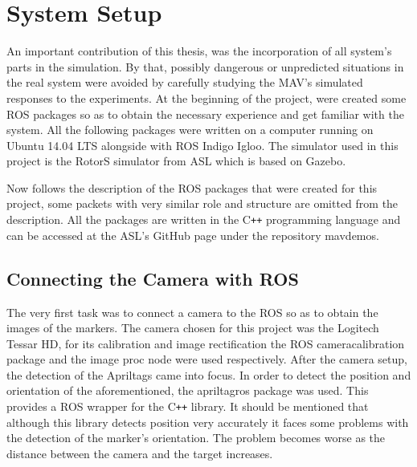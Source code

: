 \chapter{System Setup}
\label{sec:SystemSetup}

An important contribution of this thesis, was the incorporation of all system's parts in the simulation. By that,  possibly dangerous or unpredicted situations in the real system were avoided by carefully studying the MAV's simulated responses to the experiments. At the beginning of the project, were created some ROS packages so as to obtain the necessary experience and get familiar with the system. All the following packages were written on a computer running on Ubuntu 14.04 LTS alongside with ROS Indigo Igloo\protect\footnotemark. The simulator used in this project is the RotorS simulator from ASL which is based on Gazebo\cite{GazeboSimulator}.


Now follows the description of the ROS packages that were created for this project, some packets with very similar role and structure are omitted from the description. All the  packages are written in the C\texttt{++} programming language\cite{Stroustrup} and can be accessed at the ASL's GitHub page under the repository mav\textunderscore demos\cite{MyRepoGitHub}. 


\section{Connecting the Camera with ROS}
\label{sec:connectedCamera}
The very first task was to connect a camera to the ROS so as to obtain the images of the markers. The camera chosen for this project was the Logitech Tessar HD, for its calibration and image rectification the ROS camera\textunderscore calibration package and the image \textunderscore proc node were used respectively. After the camera setup, the detection of the Apriltags\cite{olson2011tags} came into focus. In order to detect the position and orientation of the aforementioned, the apriltag\textunderscore ros package was used. This provides a ROS wrapper for the C\texttt{++} library\cite{ROSApriltag}. It should be mentioned that although this library detects position very accurately it faces some problems with the detection of the marker's orientation. The problem becomes worse as the distance between the camera and the target increases. 



